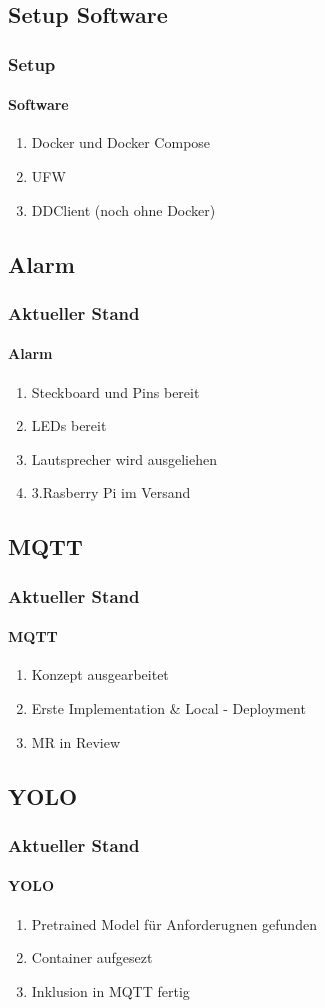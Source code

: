 \documentclass[]{beamer}
\begin{document}
\subsection{Setup Software}
\begin{frame}
\frametitle{Setup}
\framesubtitle{Software}

\begin{enumerate}
    \item Docker und Docker Compose
    \item UFW
    \item DDClient (noch ohne Docker)
\end{enumerate}
\end{frame}

\subsection{Alarm}
\begin{frame}
\frametitle{Aktueller Stand}
\framesubtitle{Alarm}
\begin{enumerate}
    \item Steckboard und Pins bereit
    \item LEDs bereit
    \item Lautsprecher wird ausgeliehen
    \item 3.Rasberry Pi im Versand 
\end{enumerate}
\end{frame}


\subsection{MQTT}
\begin{frame}
\frametitle{Aktueller Stand}
\framesubtitle{MQTT}
\begin{enumerate}
    \item Konzept ausgearbeitet
    \item Erste Implementation \& Local - Deployment
    \item MR in Review
\end{enumerate}
\end{frame}


\subsection{YOLO}
\begin{frame}
\frametitle{Aktueller Stand}
\framesubtitle{YOLO}
\begin{enumerate}
    \item Pretrained Model für Anforderugnen gefunden 
    \item Container aufgesezt
    \item Inklusion in MQTT  fertig
\end{enumerate}

\end{frame}
\end{document}
